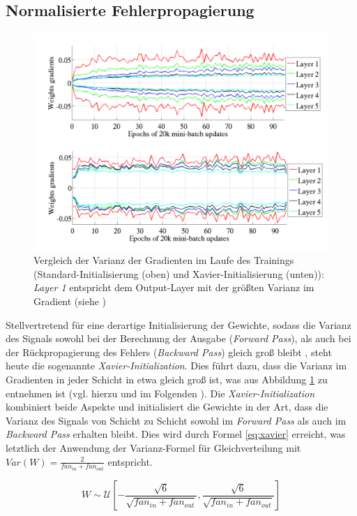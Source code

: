 \subsection{Normalisierte Fehlerpropagierung}
\begin{figure}
\centering
\includegraphics[width=0.7\linewidth]{images/4_xavier_init}
\caption[]{Vergleich der Varianz der Gradienten im Laufe des Trainings (Standard-Initialisierung (oben) und Xavier-Initialisierung (unten)): \textit{Layer 1} entspricht dem Output-Layer mit der größten Varianz im Gradient (siehe \cite{Glorot2010})}
\label{fig:4_xavier_init}
\end{figure}
Stellvertretend für eine derartige Initialisierung der Gewichte, sodass die Varianz des Signals sowohl bei der Berechnung der Ausgabe (\textit{Forward Pass}), als auch bei der Rückpropagierung des Fehlers (\textit{Backward Pass}) gleich groß bleibt  \cite[vgl. z.B.][S. 199 ff.]{Rojas1996}, steht heute die sogenannte \textit{Xavier-Initialization}. Dies führt dazu, dass die Varianz im Gradienten in jeder Schicht in etwa gleich groß ist, was aus Abbildung \ref{fig:4_xavier_init} zu entnehmen ist (vgl. hierzu und im Folgenden \cite{Glorot2010}).
Die \textit{Xavier-Initialization} kombiniert beide Aspekte und initialisiert die Gewichte in der Art, dass die Varianz des Signals von Schicht zu Schicht sowohl im \textit{Forward Pass} als auch im \textit{Backward Pass} erhalten bleibt. Dies wird durch Formel \ref{eq:xavier} erreicht, was letztlich der Anwendung der Varianz-Formel für Gleichverteilung mit $Var(W) = \frac{2}{fan_{in}  + fan_{out}}$ entspricht.

\begin{equation}
\label{eq:xavier} 
W \sim \mathcal{U} [-\frac{\sqrt{6}}{\sqrt{fan_{in}  + fan_{out}}}, \frac{\sqrt{6}}{\sqrt{fan_{in}  + fan_{out}}}]
\end{equation}

